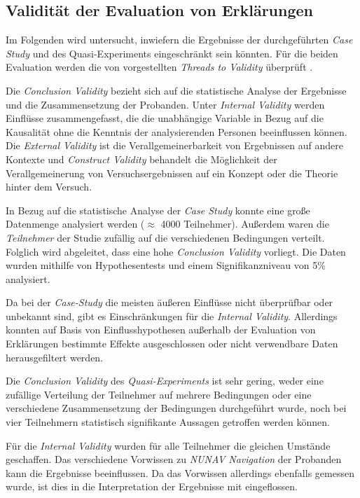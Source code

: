 \subsection{Validität der Evaluation von Erklärungen}

Im Folgenden wird untersucht, inwiefern die Ergebnisse der durchgeführten \textit{Case Study} und des Quasi-Experiments eingeschränkt sein könnten. Für die beiden Evaluation werden die von \citeauthor{wohlin2012experimentation} vorgestellten \textit{Threads to Validity} überprüft \cite{wohlin2012experimentation}.

\newpage

Die \textit{Conclusion Validity} bezieht sich auf die statistische Analyse der Ergebnisse und die Zusammensetzung der Probanden. Unter \textit{Internal Validity} werden Einflüsse zusammengefasst, die die unabhängige Variable in Bezug auf die Kausalität ohne die Kenntnis der analysierenden Personen beeinflussen können. Die \textit{External Validity} ist die Verallgemeinerbarkeit von Ergebnissen auf andere Kontexte und \textit{Construct Validity} behandelt die Möglichkeit der Verallgemeinerung von Versuchsergebnissen auf ein Konzept oder die Theorie hinter dem Versuch.

In Bezug auf die statistische Analyse der \textit{Case Study} konnte eine große Datenmenge analysiert werden ($\approx$ 4000 Teilnehmer). Außerdem waren die \textit{Teilnehmer} der Studie zufällig auf die verschiedenen Bedingungen verteilt. Folglich wird abgeleitet, dass eine hohe \textit{Conclusion Validity} vorliegt. Die Daten wurden mithilfe von Hypothesentests und einem Signifikanzniveau von 5\% analysiert.

Da bei der \textit{Case-Study} die meisten äußeren Einflüsse nicht überprüfbar oder unbekannt sind, gibt es Einschränkungen für die \textit{Internal Validity}. Allerdings konnten auf Basis von Einflusshypothesen außerhalb der Evaluation von Erklärungen bestimmte Effekte ausgeschlossen oder nicht verwendbare Daten herausgefiltert werden.

\smallskip

Die \textit{Conclusion Validity} des \textit{Quasi-Experiments} ist sehr gering, weder eine zufällige Verteilung der Teilnehmer auf mehrere Bedingungen oder eine verschiedene Zusammensetzung der Bedingungen durchgeführt wurde, noch bei vier Teilnehmern statistisch signifikante Aussagen getroffen werden können.

Für die \textit{Internal Validity} wurden für alle Teilnehmer die gleichen Umstände geschaffen. Das verschiedene Vorwissen zu \textit{NUNAV Navigation} der Probanden kann die Ergebnisse beeinflussen. Da das Vorwissen allerdings ebenfalls gemessen wurde, ist dies in die Interpretation der Ergebnisse mit eingeflossen.

